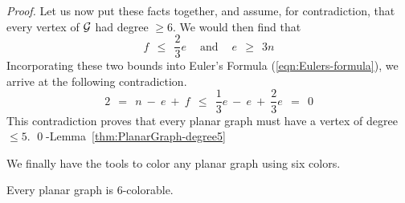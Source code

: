 \begin{proof}
Let us now put these facts together, and assume, for contradiction, that every vertex of $\mbox{$\cal G$}$ had degree $\geq 6$.  We would then find that
\[  f \ \ \leq \ \ \frac{2}{3} e  \ \ \ \ \mbox{ and } \ \ \ \  e \ \ \geq \ \ 3n  \]
Incorporating these two bounds into Euler's Formula (\ref{eqn:Eulers-formula}), we arrive at the following contradiction.
\[ 2 \ \ = \ \ n \ - \ e \  + \ f \ \ \leq \ \ \frac{1}{3} e \ - \ e \ + \ \frac{2}{3} e \ \ = \ \ 0 \]
This contradiction proves that every planar graph must have a vertex of degree $\leq 5$.
 \qed-Lemma~\ref{thm:PlanarGraph-degree5}
\end{proof}

\medskip

We finally have the tools to color any planar graph using six colors.


\begin{prop}
\label{thm:P-6-colorability}
Every planar graph is $6$-colorable.
\end{prop}

